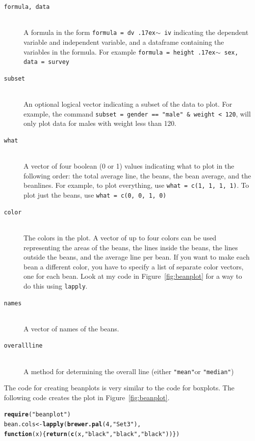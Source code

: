 \documentclass{tufte-book}\usepackage[]{graphicx}\usepackage[]{color}
\makeatletter
\newcommand{\hlnum}[1]{\textcolor[rgb]{0.686,0.059,0.569}{#1}}%
\newcommand{\hlstr}[1]{\textcolor[rgb]{0.192,0.494,0.8}{#1}}%
\newcommand{\hlstd}[1]{\textcolor[rgb]{0.345,0.345,0.345}{#1}}%
\newcommand{\hlkwa}[1]{\textcolor[rgb]{0.161,0.373,0.58}{\textbf{#1}}}%
\newcommand{\hlkwb}[1]{\textcolor[rgb]{0.69,0.353,0.396}{#1}}%
\newcommand{\hlkwc}[1]{\textcolor[rgb]{0.333,0.667,0.333}{#1}}%
\newcommand{\hlkwd}[1]{\textcolor[rgb]{0.737,0.353,0.396}{\textbf{#1}}}%
\newenvironment{kframe}{%
 \def\at@end@of@kframe{}%
 \ifinner\ifhmode%
  \def\at@end@of@kframe{\end{minipage}}%
  \begin{minipage}{\columnwidth}%
 \fi\fi%
 \def\FrameCommand##1{\hskip\@totalleftmargin \hskip-\fboxsep
 \colorbox{shadecolor}{##1}\hskip-\fboxsep
     \hskip-\linewidth \hskip-\@totalleftmargin \hskip\columnwidth}%
 \MakeFramed {\advance\hsize-\width
   \@totalleftmargin\z@ \linewidth\hsize
   \@setminipage}}%
 {\par\unskip\endMakeFramed%
 \at@end@of@kframe}
\newenvironment{knitrout}{}{} %
\makeatother
\begin{document}
\begin{footnotesize}
{{\begin{description}
  \item[\tt{formula, data}] \hfill \\
      A formula in the form \texttt{formula = dv {\raise.17ex\hbox{$\scriptstyle\sim$}} iv} indicating the dependent variable and independent variable, and a dataframe containing the variables in the formula. For example \texttt{formula = height {\raise.17ex\hbox{$\scriptstyle\sim$}} sex, data = survey}
        \item[\tt{subset}] \hfill \\
  An optional logical vector indicating a subset of the data to plot. For example, the command \texttt{subset = gender == "male" \& weight < 120}, will only plot data for males with weight less than 120.
         \item[\tt{what}] \hfill \\
A vector of four boolean (0 or 1) values indicating what to plot in the following order: the total average line, the beans, the bean average, and the beanlines. For example, to plot everything, use \texttt{what = c(1, 1, 1, 1)}. To plot just the beans, use \texttt{what = c(0, 0, 1, 0)}
        \item[\tt{color}] \hfill \\
    The colors in the plot. A vector of up to four colors can be used representing the areas of the beans, the lines inside the beans, the lines outside the beans, and the average line per bean. If you want to make each bean a different color, you have to specify a list of separate color vectors, one for each bean. Look at my code in Figure~\ref{fig:beanplot} for a way to do this using \texttt{lapply}.
        \item[\tt{names}] \hfill \\
A vector of names of the beans.
\item[\tt{overallline}] \hfill \\
A method for determining the overall line (either \texttt{"mean"}or \texttt{"median"})
\end{description}

}
}
\vspace{5mm} %

The code for creating beanplots is very similar to the code for boxplots. The following code creates the plot in Figure~\ref{fig:beanplot}. 

\begin{footnotesize}
\begin{knitrout}
\color{fgcolor}\begin{kframe}
\begin{alltt}
\hlkwd{require}\hlstd{(}\hlstr{"beanplot"}\hlstd{)}
\hlstd{bean.cols} \hlkwb{<-} \hlkwd{lapply}\hlstd{(}\hlkwd{brewer.pal}\hlstd{(}\hlnum{4}\hlstd{,} \hlstr{"Set3"}\hlstd{),}
                    \hlkwa{function}\hlstd{(}\hlkwc{x}\hlstd{) \{}\hlkwd{return}\hlstd{(}\hlkwd{c}\hlstd{(x,} \hlstr{"black"}\hlstd{,} \hlstr{"black"}\hlstd{,} \hlstr{"black"}\hlstd{))\})}


\end{alltt}
\end{kframe}
\end{knitrout}
\end{footnotesize}
\end{footnotesize}
\end{document}
